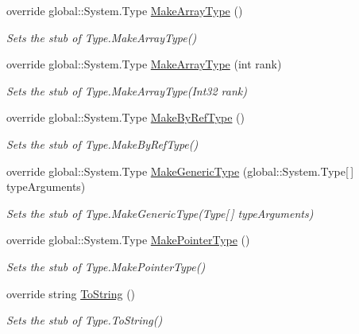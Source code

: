 \begin{DoxyCompactItemize}
override global\-::\-System.\-Type \hyperlink{class_system_1_1_fakes_1_1_stub_type_ac9c9e09bbd76a729214981987d4bfde9}{Make\-Array\-Type} ()
\begin{DoxyCompactList}\small\item\em Sets the stub of Type.\-Make\-Array\-Type()\end{DoxyCompactList}\item 
override global\-::\-System.\-Type \hyperlink{class_system_1_1_fakes_1_1_stub_type_a66e702e72ce627ad227d000d77a1a5ef}{Make\-Array\-Type} (int rank)
\begin{DoxyCompactList}\small\item\em Sets the stub of Type.\-Make\-Array\-Type(\-Int32 rank)\end{DoxyCompactList}\item 
override global\-::\-System.\-Type \hyperlink{class_system_1_1_fakes_1_1_stub_type_afed24047e1f95ba23cf0de0fc758db08}{Make\-By\-Ref\-Type} ()
\begin{DoxyCompactList}\small\item\em Sets the stub of Type.\-Make\-By\-Ref\-Type()\end{DoxyCompactList}\item 
override global\-::\-System.\-Type \hyperlink{class_system_1_1_fakes_1_1_stub_type_ace1ef883df9382dbc41b1792d7bd0204}{Make\-Generic\-Type} (global\-::\-System.\-Type\mbox{[}$\,$\mbox{]} type\-Arguments)
\begin{DoxyCompactList}\small\item\em Sets the stub of Type.\-Make\-Generic\-Type(\-Type\mbox{[}$\,$\mbox{]} type\-Arguments)\end{DoxyCompactList}\item 
override global\-::\-System.\-Type \hyperlink{class_system_1_1_fakes_1_1_stub_type_af8c67ef24c21ea46a50ed6e354c4fdf8}{Make\-Pointer\-Type} ()
\begin{DoxyCompactList}\small\item\em Sets the stub of Type.\-Make\-Pointer\-Type()\end{DoxyCompactList}\item 
override string \hyperlink{class_system_1_1_fakes_1_1_stub_type_a2a9dcb79ea5631069943b54bc5c6e3f7}{To\-String} ()
\begin{DoxyCompactList}\small\item\em Sets the stub of Type.\-To\-String()\end{DoxyCompactList}\end{DoxyCompactItemize}
